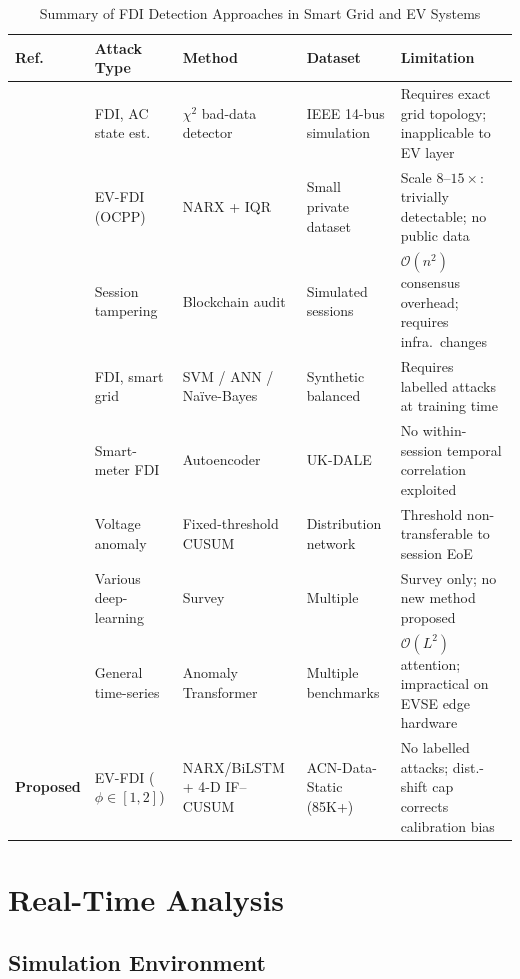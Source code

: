 \documentclass[journal]{IEEEtran}
\begin{document}
\begin{table}[!t]
\caption{Summary of FDI Detection Approaches in Smart Grid and EV Systems}
\label{tab:survey}
\centering
\begin{tabular}{|p{1.3cm}|p{2.6cm}|p{3.2cm}|p{3.2cm}|p{4.2cm}|}
\hline
\textbf{Ref.} & \textbf{Attack Type} & \textbf{Method} &
\textbf{Dataset} & \textbf{Limitation} \\
\hline
\cite{liu2011false}   & FDI, AC state est. & $\chi^2$ bad-data detector &
IEEE 14-bus simulation & Requires exact grid topology; inapplicable to EV layer \\
\cite{basumatary2025} & EV-FDI (OCPP) & NARX + IQR &
Small private dataset & Scale $8$--$15\times$: trivially detectable; no public data \\
\cite{sarieddine2023} & Session tampering & Blockchain audit &
Simulated sessions & $\mathcal{O}(n^2)$ consensus overhead; requires infra.\ changes \\
\cite{sakhnini2019}   & FDI, smart grid & SVM / ANN / Na\"{i}ve-Bayes &
Synthetic balanced & Requires labelled attacks at training time \\
\cite{wang2020detection} & Smart-meter FDI & Autoencoder &
UK-DALE & No within-session temporal correlation exploited \\
\cite{he2020cyber}    & Voltage anomaly & Fixed-threshold CUSUM &
Distribution network & Threshold non-transferable to session EoE \\
\cite{musleh2019}     & Various deep-learning & Survey &
Multiple & Survey only; no new method proposed \\
\cite{xu2022anomaly}  & General time-series & Anomaly Transformer &
Multiple benchmarks & $\mathcal{O}(L^2)$ attention; impractical on EVSE edge hardware \\
\textbf{Proposed}     & EV-FDI ($\phi\!\in\![1,2]$) &
NARX/BiLSTM + 4-D IF--CUSUM & ACN-Data-Static (85K+) &
No labelled attacks; dist.-shift cap corrects calibration bias \\
\hline
\end{tabular}
\end{table}

\section{Real-Time Analysis}
\label{sec:realtime}

\subsection{Simulation Environment}
\end{document}
